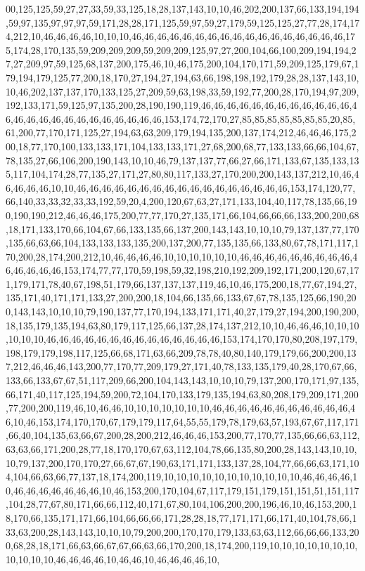 00,125,125,59,27,27,33,59,33,125,18,28,137,143,10,10,46,202,200,137,66,133,194,194,59,97,135,97,97,97,59,171,28,28,171,125,59,97,59,27,179,59,125,125,27,77,28,174,174,212,10,46,46,46,46,10,10,10,46,46,46,46,46,46,46,46,46,46,46,46,46,46,46,46,46,175,174,28,170,135,59,209,209,209,59,209,209,125,97,27,200,104,66,100,209,194,194,27,27,209,97,59,125,68,137,200,175,46,10,46,175,200,104,170,171,59,209,125,179,67,179,194,179,125,77,200,18,170,27,194,27,194,63,66,198,198,192,179,28,28,137,143,10,10,46,202,137,137,170,133,125,27,209,59,63,198,33,59,192,77,200,28,170,194,97,209,192,133,171,59,125,97,135,200,28,190,190,119,46,46,46,46,46,46,46,46,46,46,46,46,46,46,46,46,46,46,46,46,46,46,46,46,46,153,174,72,170,27,85,85,85,85,85,85,85,20,85,61,200,77,170,171,125,27,194,63,63,209,179,194,135,200,137,174,212,46,46,46,175,200,18,77,170,100,133,133,171,104,133,133,171,27,68,200,68,77,133,133,66,66,104,67,78,135,27,66,106,200,190,143,10,10,46,79,137,137,77,66,27,66,171,133,67,135,133,135,117,104,174,28,77,135,27,171,27,80,80,117,133,27,170,200,200,143,137,212,10,46,46,46,46,46,10,10,46,46,46,46,46,46,46,46,46,46,46,46,46,46,46,46,46,153,174,120,77,66,140,33,33,32,33,33,192,59,20,4,200,120,67,63,27,171,133,104,40,117,78,135,66,190,190,190,212,46,46,46,175,200,77,77,170,27,135,171,66,104,66,66,66,133,200,200,68,18,171,133,170,66,104,67,66,133,135,66,137,200,143,143,10,10,10,79,137,137,77,170,135,66,63,66,104,133,133,133,135,200,137,200,77,135,135,66,133,80,67,78,171,117,170,200,28,174,200,212,10,46,46,46,46,10,10,10,10,10,10,46,46,46,46,46,46,46,46,46,46,46,46,46,46,153,174,77,77,170,59,198,59,32,198,210,192,209,192,171,200,120,67,171,179,171,78,40,67,198,51,179,66,137,137,137,119,46,10,46,175,200,18,77,67,194,27,135,171,40,171,171,133,27,200,200,18,104,66,135,66,133,67,67,78,135,125,66,190,200,143,143,10,10,10,79,190,137,77,170,194,133,171,171,40,27,179,27,194,200,190,200,18,135,179,135,194,63,80,179,117,125,66,137,28,174,137,212,10,10,46,46,46,10,10,10,10,10,10,46,46,46,46,46,46,46,46,46,46,46,46,46,46,153,174,170,170,80,208,197,179,198,179,179,198,117,125,66,68,171,63,66,209,78,78,40,80,140,179,179,66,200,200,137,212,46,46,46,143,200,77,170,77,209,179,27,171,40,78,133,135,179,40,28,170,67,66,133,66,133,67,67,51,117,209,66,200,104,143,143,10,10,10,79,137,200,170,171,97,135,66,171,40,117,125,194,59,200,72,104,170,133,179,135,194,63,80,208,179,209,171,200,77,200,200,119,46,10,46,46,10,10,10,10,10,10,10,46,46,46,46,46,46,46,46,46,46,46,46,10,46,153,174,170,170,67,179,179,117,64,55,55,179,78,179,63,57,193,67,67,117,171,66,40,104,135,63,66,67,200,28,200,212,46,46,46,153,200,77,170,77,135,66,66,63,112,63,63,66,171,200,28,77,18,170,170,67,63,112,104,78,66,135,80,200,28,143,143,10,10,10,79,137,200,170,170,27,66,67,67,190,63,171,171,133,137,28,104,77,66,66,63,171,104,104,66,63,66,77,137,18,174,200,119,10,10,10,10,10,10,10,10,10,10,10,46,46,46,46,10,46,46,46,46,46,46,46,10,46,153,200,170,104,67,117,179,151,179,151,151,51,151,117,104,28,77,67,80,171,66,66,112,40,171,67,80,104,106,200,200,196,46,10,46,153,200,18,170,66,135,171,171,66,104,66,66,66,171,28,28,18,77,171,171,66,171,40,104,78,66,133,63,200,28,143,143,10,10,10,79,200,200,170,170,179,133,63,63,112,66,66,66,133,200,68,28,18,171,66,63,66,67,67,66,63,66,170,200,18,174,200,119,10,10,10,10,10,10,10,10,10,10,10,46,46,46,46,10,46,46,10,46,46,46,46,10,